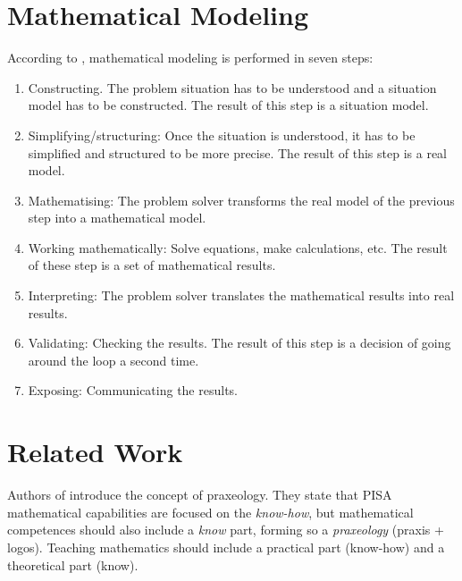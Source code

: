 \documentclass[a4paper, 10pt]{article}
\begin{document}
\section{Mathematical Modeling}
According to \cite{blum2009mathematical}, mathematical modeling is performed in seven steps:
\begin{enumerate}
    \item Constructing. The problem situation has to be understood and a situation model has to be constructed. The result of this step is a situation model. 
    \item Simplifying/structuring: Once the situation is understood, it has to be simplified and structured to be more precise. The result of this step is a real model. 
    \item Mathematising: The problem solver transforms the real model of the previous step into a mathematical model. 
    \item Working mathematically: Solve equations, make calculations, etc. The result of these step is a set of mathematical results. 
    \item Interpreting: The problem solver translates the mathematical results into real results.
    \item Validating: Checking the results. The result of this step is a decision of going around the loop a second time. 
    \item Exposing: Communicating the results. 
\end{enumerate}

\section{Related Work}
Authors of \cite{bua2016competencia} introduce the concept of praxeology. They state that PISA mathematical capabilities are focused on the \textit{know-how}, but mathematical competences should also include a \textit{know} part, forming so a \textit{praxeology} (praxis + logos). Teaching mathematics should include a practical part (know-how) and a theoretical part (know). 


\end{document}
